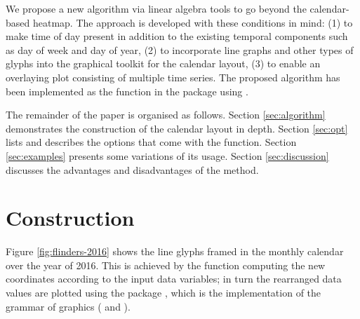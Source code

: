 \documentclass[article]{jss}
\begin{document}
We propose a new algorithm via linear algebra tools to go beyond the
calendar-based heatmap. The approach is developed with these conditions
in mind: (1) to make time of day present in addition to the existing
temporal components such as day of week and day of year, (2) to
incorporate line graphs and other types of glyphs into the graphical
toolkit for the calendar layout, (3) to enable an overlaying plot
consisting of multiple time series. The proposed algorithm has been
implemented as the  function in the 
package \citep{R-sugrrants} using  \citep{R-base}.

The remainder of the paper is organised as follows. Section
\ref{sec:algorithm} demonstrates the construction of the calendar layout
in depth. Section \ref{sec:opt} lists and describes the options that
come with the  function. Section \ref{sec:examples}
presents some variations of its usage. Section \ref{sec:discussion}
discusses the advantages and disadvantages of the method.

\section{Construction}\label{construction}

\label{sec:algorithm}

Figure \ref{fig:flinders-2016} shows the line glyphs framed in the
monthly calendar over the year of 2016. This is achieved by the
 function computing the new coordinates according
to the input data variables; in turn the rearranged data values are
plotted using the  package \citep{R-ggplot2}, which is the
implementation of the grammar of graphics (\citet{wilkinson2006grammar}
and \citet{wickham2010layered}).
\end{document}
